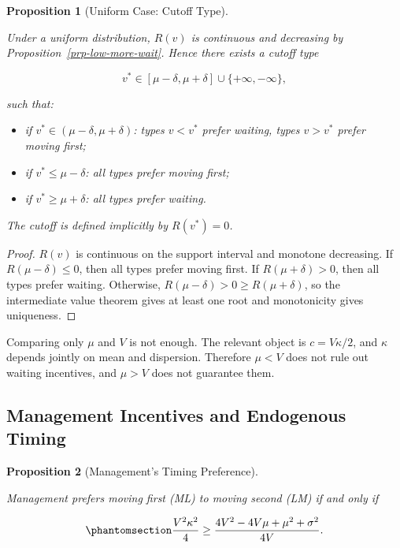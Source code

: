 \documentclass[
  english,
  a4paper,
  12pt]{article}
\providecommand{\tightlist}{%
  \setlength{\itemsep}{0pt}\setlength{\parskip}{0pt}}
\theoremstyle{plain}
\newtheorem{proposition}{Proposition}[section]
\theoremstyle{plain}
\theoremstyle{definition}
\theoremstyle{remark}
\begin{document}
\begin{proposition}[Uniform Case: Cutoff
Type]\protect\hypertarget{prp-uniform-cutoff}{}\label{prp-uniform-cutoff}

Under a uniform distribution, \(R(v)\) is continuous and decreasing by
Proposition~\ref{prp-low-more-wait}. Hence there exists a cutoff type

\[
v^*\in[\mu-\delta,\mu+\delta]\cup\{+\infty,-\infty\},
\]

such that:

\begin{itemize}
\tightlist
\item
  if \(v^*\in(\mu-\delta,\mu+\delta)\): types \(v<v^*\) prefer waiting,
  types \(v>v^*\) prefer moving first;
\item
  if \(v^*\le \mu-\delta\): all types prefer moving first;
\item
  if \(v^*\ge \mu+\delta\): all types prefer waiting.
\end{itemize}

The cutoff is defined implicitly by \(R(v^*)=0\).

\end{proposition}

\begin{proof}
\(R(v)\) is continuous on the support interval and monotone decreasing.
If \(R(\mu-\delta)\le 0\), then all types prefer moving first. If
\(R(\mu+\delta)>0\), then all types prefer waiting. Otherwise,
\(R(\mu-\delta)>0\ge R(\mu+\delta)\), so the intermediate value theorem
gives at least one root and monotonicity gives uniqueness.
\end{proof}

Comparing only \(\mu\) and \(V\) is not enough. The relevant object is
\(c=V\kappa/2\), and \(\kappa\) depends jointly on mean and dispersion.
Therefore \(\mu<V\) does not rule out waiting incentives, and \(\mu>V\)
does not guarantee them.

\subsection{Management Incentives and Endogenous
Timing}\label{sec-endogenous}

\begin{proposition}[Management's Timing
Preference]\protect\hypertarget{prp-mgmt}{}\label{prp-mgmt}

Management prefers moving first (ML) to moving second (LM) if and only
if

\begin{equation}\phantomsection\label{eq-mgmt-cond}{
\frac{V^2\kappa^2}{4} \ge \frac{4V^2-4V\mu+\mu^2+\sigma^2}{4V}.
}\end{equation}

\end{proposition}
\end{document}
